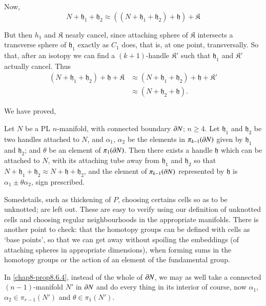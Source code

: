 Now,
$$
N+\mathfrak{h}_{1}+\mathfrak{h}_{2}\approx ((N+\mathfrak{h}_{1}+\mathfrak{h}_{2})+\mathfrak{h})+\mathfrak{K}
$$

But then $h_{1}$ and $\mathfrak{K}$ nearly cancel, since attaching sphere of $\mathfrak{K}$ intersects a transverse sphere of $\mathfrak{h}_{1}$ exactly as $C_{1}$ does, that is, at one point, transversally. So that, after an isotopy we can find a $(k+1)$-handle $\mathfrak{K}'$ such that $\mathfrak{h}_{1}$ and $\mathfrak{K}'$ actually cancel. Thus
\begin{align*}
(N+\mathfrak{h}_{1}+\mathfrak{h}_{2})+\mathfrak{h}+\mathfrak{K} &\approx (N+\mathfrak{h}_{1}+\mathfrak{h}_{2})+\mathfrak{h}+\mathfrak{K}'\\
&\approx (N+\mathfrak{h}_{2}+\mathfrak{h}).
\end{align*}

We have proved,

\setcounter{proposition}{3}
\begin{proposition}\label{chap8-prop8.6.4}
Let $N$ be a PL $n$-manifold, with connected boundary $\partial N$; $n\geq 4$. Let $\mathfrak{h}_{1}$ and $\mathfrak{h}_{2}$ be two handles attached to $N$, and $\alpha_{1}$, $\alpha_{2}$ be the elements in $\pi_{k-1}(\partial N)$ given by $\mathfrak{h}_{1}$ and $\mathfrak{h}_{2}$; and $\theta$ be an element of $\pi_{1}(\partial N)$. Then there exists a handle $\mathfrak{h}$ which can be attached to $N$, with its attaching tube away from $\mathfrak{h}_{1}$ and $\mathfrak{h}_{2}$ so that $N+\mathfrak{h}_{1}+\mathfrak{h}_{2}\approx N+\mathfrak{h}+\mathfrak{h}_{2}$, and the element of $\pi_{k-1}(\partial N)$ represented by $\mathfrak{h}$ is $\alpha_{1}\pm \theta \alpha_{2}$, sign prescribed.
\end{proposition}


\setcounter{rem}{0}
\begin{rem}%
Some\pageoriginale details, such as thickening of $P$, choosing certains cells so as to be unknotted; are left out. These are easy to verify using our definition of unknotted cells and choosing regular neighbourhoods in the appropriate manifolds. There is another point to check: that the homotopy groups can be defined with cells as `base points', so that we can get away without spoiling the embeddings (of attaching spheres in appropriate dimensions), when forming sums in the homotopy groups or the action of an element of the fundamental group.
\end{rem}

\begin{rem}%
In \ref{chap8-prop8.6.4}, instead of the whole of $\partial N$, we may as well take a connected $(n-1)$-manifold $N'$ in $\partial N$ and do every thing in its interior of course, now $\alpha_{1}$, $\alpha_{2}\in\pi_{r-1}(N')$ and $\theta\in \pi_{1}(N')$. 
\end{rem}

